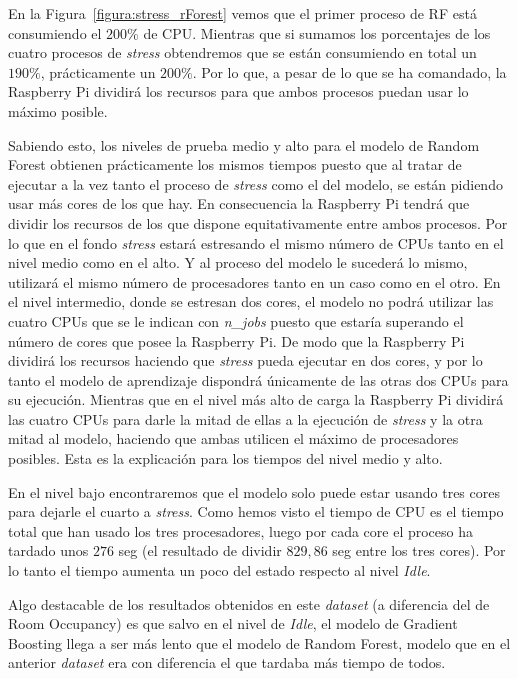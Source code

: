 \documentclass[a4paper, 12pt]{book}
\begin{document}
En la Figura~\ref{figura:stress_rForest} vemos que el primer proceso de RF está consumiendo el $200\%$ de CPU. Mientras que si sumamos los porcentajes de los cuatro procesos de \textit{stress} obtendremos que se están consumiendo en total un $190\%$, prácticamente un $200\%$. Por lo que, a pesar de lo que se ha comandado, la Raspberry Pi dividirá los recursos para que ambos procesos puedan usar lo máximo posible.

Sabiendo esto, los niveles de prueba medio y alto para el modelo de Random Forest obtienen prácticamente los mismos tiempos puesto que al tratar de ejecutar a la vez tanto el proceso de \textit{stress} como el del modelo, se están pidiendo usar más cores de los que hay. En consecuencia la Raspberry Pi tendrá que dividir los recursos de los que dispone equitativamente entre ambos procesos. Por lo que en el fondo \textit{stress} estará estresando el mismo número de CPUs tanto en el nivel medio como en el alto. Y al proceso del modelo le sucederá lo mismo, utilizará el mismo número de procesadores tanto en un caso como en el otro. En el nivel intermedio, donde se estresan dos cores, el modelo no podrá utilizar las cuatro CPUs que se le indican con \textit{n\_jobs} puesto que estaría superando el número de cores que posee la Raspberry Pi. De modo que la Raspberry Pi dividirá los recursos haciendo que \textit{stress} pueda ejecutar en dos cores, y por lo tanto el modelo de aprendizaje dispondrá únicamente de las otras dos CPUs para su ejecución. Mientras que en el nivel más alto de carga la Raspberry Pi dividirá las cuatro CPUs para darle la mitad de ellas a la ejecución de \textit{stress} y la otra mitad al modelo, haciendo que ambas utilicen el máximo de procesadores posibles. Esta es la explicación para los tiempos del nivel medio y alto. 

En el nivel bajo encontraremos que el modelo solo puede estar usando tres cores para dejarle el cuarto a \textit{stress}. Como hemos visto el tiempo de CPU es el tiempo total que han usado los tres procesadores, luego por cada core el proceso ha tardado unos $276$ seg (el resultado de dividir $829,86$ seg entre los tres cores). Por lo tanto el tiempo aumenta un poco del estado respecto al nivel \textit{Idle}.

Algo destacable de los resultados obtenidos en este \textit{dataset} (a diferencia del de Room Occupancy) es que salvo en el nivel de \textit{Idle}, el modelo de Gradient Boosting llega a ser más lento que el modelo de Random Forest, modelo que en el anterior \textit{dataset} era con diferencia el que tardaba más tiempo de todos.
\end{document}
